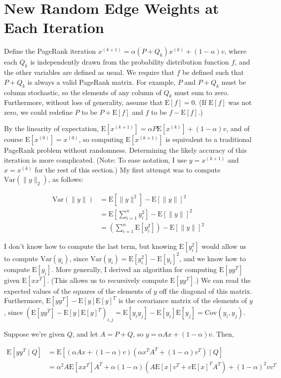 \documentclass{article}
\newcommand \E[1] {\mathrm E \left[#1\right]} %
\newcommand \Var[1] {\mathrm {Var} \left(#1\right)} %
\newcommand \Cov[2] {\mathrm {Cov} (#1, #2)} %
\newcommand \vitr [2] {#1^{(#2)}} %
\begin{document}
\section{New Random Edge Weights at Each Iteration}

Define the PageRank iteration $\vitr x {k+1} =\alpha (P+Q_k)\vitr x k
+ (1-\alpha)v$, where each $Q_k$ is independently drawn from the
probability distribution function $f$, and the other variables are
defined as usual. We require that $f$ be defined such that $P+Q_k$ is
always a valid PageRank matrix. For example, $P$ and $P+Q_k$ must be
column stochastic, so the elements of any column of $Q_k$ must sum to
zero. Furthermore, without loss of generality, assume that $\E f =
0$. (If $\E f$ was not zero, we could redefine $P$ to be $P+\E f$ and
$f$ to be $f-\E f$.)

By the linearity of expectation, $\E {\vitr x {k+1}} = \alpha P
\E{\vitr x k} + (1-\alpha)v$, and of course $\E {\vitr x 0} = \vitr x
0$, so computing $\E {\vitr x {k+1}}$ is equivalent to a traditional
PageRank problem without randomness. Determining the likely accuracy
of this iteration is more complicated. (Note: To ease notation, I use
$y = \vitr x {k+1}$ and $x = \vitr x k$ for the rest of this section.)
My first attempt was to compute $\Var{\| y\|_2}$, as follows:

\begin{align*}
\Var{\|y\|} &= \E{\|y\|^2}-\E{\|y\|}^2\\ &= \E{\sum_{i=1}^n
  y_i^2}-\E{\|y\|}^2\\ &= \left(\sum_{i=1}^n
\E{y_i^2}\right)-\E{\|y\|}^2
\end{align*}

I don't know how to compute the last term, but knowing $\E{y_i^2}$
would allow us to compute $\Var{y_i}$, since
$\Var{y_i}=\E{y_i^2}-\E{y_i}^2$, and we know how to compute
$\E{y_i}$. More generally, I derived an algorithm for computing
$\E{yy^T}$ given $\E{xx^T}$. (This allows us to recursively compute
$\E{yy^T}$.) We can read the expected values of the squares of the
elements of $y$ off the diagonal of this matrix. Furthermore,
$\E{yy^T}-\E{y}\E{y}^T$ is the covariance matrix of the elements of
$y$, since
$\left(\E{yy^T}-\E{y}\E{y}^T\right)_{i,j}=\E{y_iy_j}-\E{y_i}\E{y_j}=\Cov{y_i}{y_j}$.

Suppose we're given $Q$, and let $A=P+Q$, so $y=\alpha Ax +
(1-\alpha)v$. Then,

\begin{align*}
\E{y y^T \mid Q} &= \E{\left(\alpha Ax+(1-\alpha)v\right) \left(\alpha
  x^T A^T+(1-\alpha)v^T\right) \mid Q} \\ &= \alpha^2 A\E{x x^T}A^T +
\alpha(1-\alpha)(A \E x v^T + v {\E x}^T A^T )+ (1-\alpha)^2 vv^T
\end{align*}
\end{document}
